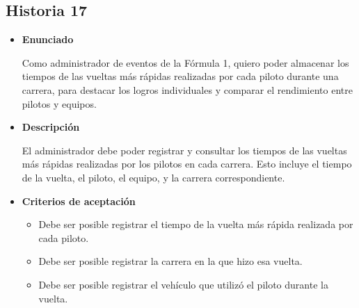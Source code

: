 \documentclass{article}
\begin{document}
	\subsection{Historia 17}
	\begin{itemize}
		
		\item \large{\textbf{Enunciado}}
		\begin{description}
			Como administrador de eventos de la Fórmula 1, quiero poder almacenar los tiempos de las vueltas más rápidas realizadas por cada piloto durante una carrera, para destacar los logros individuales y comparar el rendimiento entre pilotos y equipos.

		\end{description}
		
		\item \large{\textbf{Descripción}}
		\begin{description}
			El administrador debe poder registrar y consultar los tiempos de las vueltas más rápidas realizadas por los pilotos en cada carrera. Esto incluye el tiempo de la vuelta, el piloto, el equipo, y la carrera correspondiente.

		\end{description}
		
		\item \large{\textbf{Criterios de aceptación}}
		\begin{itemize}
			\item Debe ser posible registrar el tiempo de la vuelta más rápida realizada por cada piloto. 
			\item Debe ser posible registrar la carrera en la que hizo esa vuelta.
			\item Debe ser posible registrar el vehículo que utilizó el piloto durante la vuelta.
			
		\end{itemize}
		
	\end{itemize}
	
\end{document}
